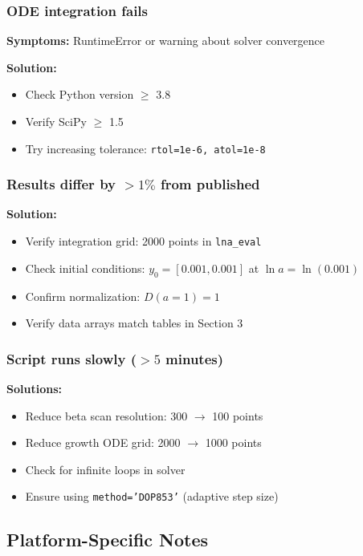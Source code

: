 \documentclass[11pt]{article}
\begin{document}
\subsubsection{ODE integration fails}

\textbf{Symptoms:} RuntimeError or warning about solver convergence

\textbf{Solution:}
\begin{itemize}
    \item Check Python version $\geq$ 3.8
    \item Verify SciPy $\geq$ 1.5
    \item Try increasing tolerance: \texttt{rtol=1e-6, atol=1e-8}
\end{itemize}

\subsubsection{Results differ by $>1\%$ from published}

\textbf{Solution:}
\begin{itemize}
    \item Verify integration grid: 2000 points in \texttt{lna\_eval}
    \item Check initial conditions: $y_0 = [0.001, 0.001]$ at $\ln a = \ln(0.001)$
    \item Confirm normalization: $D(a=1) = 1$
    \item Verify data arrays match tables in Section 3
\end{itemize}

\subsubsection{Script runs slowly ($>5$ minutes)}

\textbf{Solutions:}
\begin{itemize}
    \item Reduce beta scan resolution: 300 $\to$ 100 points
    \item Reduce growth ODE grid: 2000 $\to$ 1000 points
    \item Check for infinite loops in solver
    \item Ensure using \texttt{method='DOP853'} (adaptive step size)
\end{itemize}

\subsection{Platform-Specific Notes}
\end{document}
